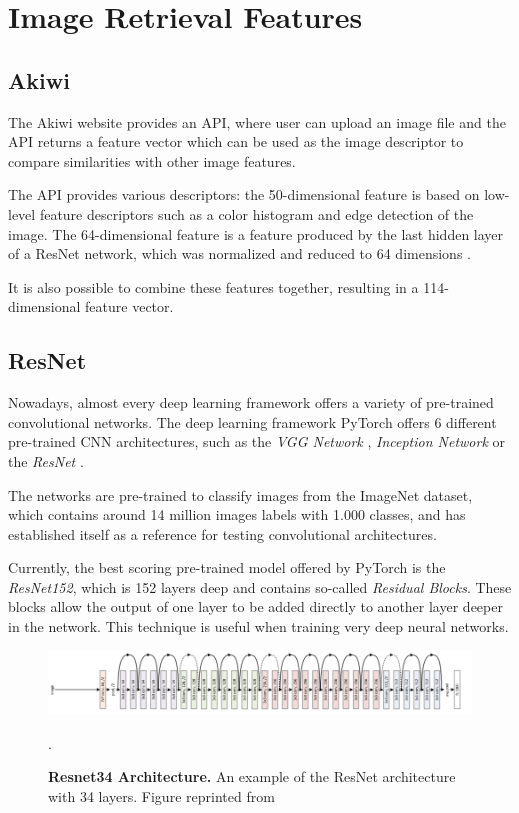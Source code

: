 \documentclass[12pt]{report}
\begin{document}
\pagebreak
\section{Image Retrieval Features}

\subsection{Akiwi}
The Akiwi website \cite{sonnenberg_akiwi_nodate} provides an API, where user can upload an image file and the API returns a feature vector which can be used as the image descriptor to compare similarities with other image features.

The API provides various descriptors: the 50-dimensional feature is based on low-level feature descriptors such as a color histogram and edge detection of the image. The 64-dimensional feature is a feature produced by the last hidden layer of a ResNet network, which was normalized and reduced to 64 dimensions \cite{Barthel:2017:VBM:3078971.3079016}.

It is also possible to combine these features together, resulting in a 114-dimensional feature vector.

\subsection{ResNet}
Nowadays, almost every deep learning framework offers a variety of pre-trained convolutional networks. The deep learning framework PyTorch offers 6 different pre-trained CNN architectures, such as the \textit{VGG Network} \cite{simonyan_very_2014}, \textit{Inception Network} \cite{szegedy_rethinking_2015} or the \textit{ResNet} \cite{he_deep_2015}. 

The networks are pre-trained to classify images from the ImageNet dataset, which contains around 14 million images labels with 1.000 classes, and has established itself as a reference for testing convolutional architectures. 

Currently, the best scoring pre-trained model offered by PyTorch is the \textit{ResNet152}, which is 152 layers deep and contains so-called \textit{Residual Blocks}. These blocks allow the output of one layer to be added directly to another layer deeper in the network. This technique is useful when training very deep neural networks.

\begin{figure}[h]
\centering
{\includegraphics[width=\linewidth]{02_background/CBIR/resnet_arch}}
\caption{\label{fig:resnet34} \textbf{Resnet34 Architecture.} An example of the ResNet architecture with 34 layers. Figure reprinted from \cite{noauthor_resnet-152_nodate}}.
\end{figure}
\end{document}
